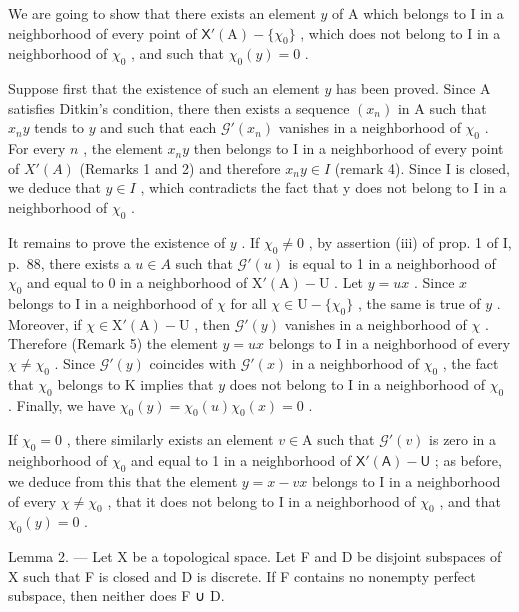 We are going to show that there exists an element \(y\) of A which belongs to I in a neighborhood of every point of \(\mathsf{X}'(\mathrm{A}) - \{\chi_0\}\) , which does not belong to I in a neighborhood of \(\chi_0\) , and such that \(\chi_0(y) = 0\) .

Suppose first that the existence of such an element \(y\) has been proved. Since A satisfies Ditkin's condition, there then exists a sequence \((x_n)\) in A such that \(x_n y\) tends to \(y\) and such that each \(\mathcal{G}'(x_n)\) vanishes in a neighborhood of \(\chi_0\) . For every \(n\) , the element \(x_n y\) then belongs to I in a neighborhood of every point of \(X'(A)\) (Remarks 1 and 2) and therefore \(x_{n}y \in I\) (remark 4). Since I is closed, we deduce that \(y \in I\) , which contradicts the fact that y does not belong to I in a neighborhood of \(\chi_{0}\) .

It remains to prove the existence of \(y\) . If \(\chi_0 \neq 0\) , by assertion (iii) of prop. 1 of I, p.~88, there exists a \(u \in A\) such that \(\mathcal{G}'(u)\) is equal to 1 in a neighborhood of \(\chi_0\) and equal to 0 in a neighborhood of \(\mathrm{X}'(\mathrm{A}) - \mathrm{U}\) . Let \(y = ux\) . Since \(x\) belongs to I in a neighborhood of \(\chi\) for all \(\chi \in \mathrm{U} - \{\chi_0\}\) , the same is true of \(y\) . Moreover, if \(\chi \in \mathrm{X}'(\mathrm{A}) - \mathrm{U}\) , then \(\mathcal{G}'(y)\) vanishes in a neighborhood of \(\chi\) . Therefore (Remark 5) the element \(y = ux\) belongs to I in a neighborhood of every \(\chi \neq \chi_0\) . Since \(\mathcal{G}'(y)\) coincides with \(\mathcal{G}'(x)\) in a neighborhood of \(\chi_0\) , the fact that \(\chi_0\) belongs to K implies that \(y\) does not belong to I in a neighborhood of \(\chi_0\) . Finally, we have \(\chi_0(y) = \chi_0(u)\chi_0(x) = 0\) .

If \(\chi_0 = 0\) , there similarly exists an element \(v \in \mathrm{A}\) such that \(\mathcal{G}'(v)\) is zero in a neighborhood of \(\chi_0\) and equal to 1 in a neighborhood of \(\mathsf{X}'(\mathsf{A}) - \mathsf{U}\) ; as before, we deduce from this that the element \(y = x - vx\) belongs to I in a neighborhood of every \(\chi \neq \chi_0\) , that it does not belong to I in a neighborhood of \(\chi_0\) , and that \(\chi_0(y) = 0\) .

Lemma 2. — Let X be a topological space. Let F and D be disjoint subspaces of X such that F is closed and D is discrete. If F contains no nonempty perfect subspace, then neither does F ∪ D.

